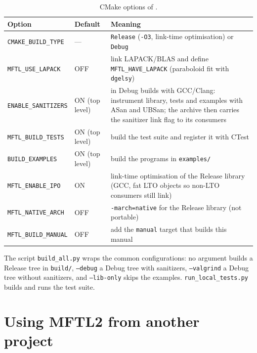 \begin{table}[ht]
\centering\small
\begin{tabularx}{\textwidth}{@{}llX@{}}
\toprule
Option & Default & Meaning \\
\midrule
\texttt{CMAKE\_BUILD\_TYPE} & --- & \texttt{Release} (\texttt{-O3}, link-time optimisation) or \texttt{Debug} \\
\texttt{MFTL\_USE\_LAPACK} & OFF & link LAPACK/BLAS and define \texttt{MFTL\_HAVE\_LAPACK} (paraboloid fit with \texttt{dgelsy}) \\
\texttt{ENABLE\_SANITIZERS} & ON (top level) & in Debug builds with GCC/Clang: instrument library, tests and examples with ASan and UBSan; the archive then carries the sanitizer link flag to its consumers \\
\texttt{MFTL\_BUILD\_TESTS} & ON (top level) & build the test suite and register it with CTest \\
\texttt{BUILD\_EXAMPLES} & ON (top level) & build the programs in \texttt{examples/} \\
\texttt{MFTL\_ENABLE\_IPO} & ON & link-time optimisation of the Release library (GCC, fat LTO objects so non-LTO consumers still link) \\
\texttt{MFTL\_NATIVE\_ARCH} & OFF & \texttt{-march=native} for the Release library (not portable) \\
\texttt{MFTL\_BUILD\_MANUAL} & OFF & add the \texttt{manual} target that builds this manual \\
\bottomrule
\end{tabularx}
\caption{CMake options of \mftl.}
\label{tab:cmake}
\end{table}

The script \texttt{build\_all.py} wraps the common configurations: no argument builds a Release
tree in \texttt{build/}, \texttt{--debug} a Debug tree with sanitizers, \texttt{--valgrind} a
Debug tree without sanitizers, and \texttt{--lib-only} skips the examples.
\texttt{run\_local\_tests.py} builds and runs the test suite.

\section{Using MFTL2 from another project}

